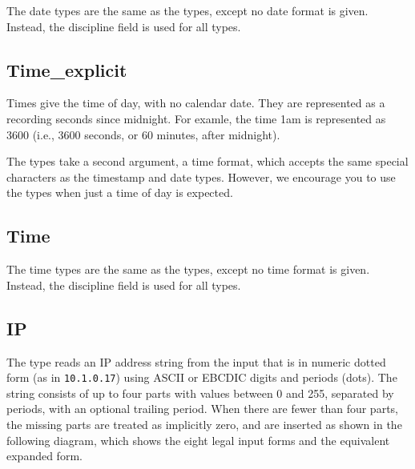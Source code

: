 \aedBegin{}
\aedEnd{}

The date types are the same as the  types,
except no date format is given.  Instead, the \pads{}
discipline field  is used
for all  types.

\subsection{Time\_explicit}

\aedBegin{}
\aedEnd{}

Times give the time of day, with no calendar date.  They are
represented as a  recording seconds since midnight.  For
examle, the time 1am is represented as 3600 (i.e., 3600 seconds, or 60
minutes, after midnight).

The  types take a second argument, a time format, which
accepts the same special characters as the timestamp and date types.
However, we encourage you to use the  types when just a time of
day is expected.

\subsection{Time}

\aedBegin{}
\aedEnd{}

The time types are the same as the  types,
except no time format is given.  Instead, the \pads{}
discipline field  is used
for all  types.

\subsection{IP}

\aedBegin{}
\aedEnd{}

The  type reads an IP address string from the input that is in
numeric dotted form (as in {\tt 10.1.0.17}) using ASCII or EBCDIC
digits and periods (dots).  The string consists of up to four
parts with values between 0 and 255, separated by periods,
with an optional trailing period.  When there are
fewer than four parts, the missing parts are treated as implicitly
zero, and are inserted as shown in the following diagram,
which shows the eight legal input forms and the equivalent expanded form.

